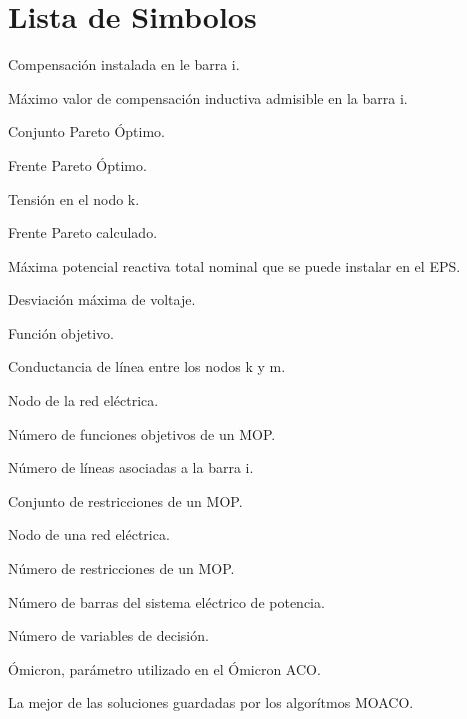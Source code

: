 \newpage

\chapter*{Lista de Simbolos}

\begin{Nomencl}[2em]

\item[$B_i$] Compensaci\'on instalada en le barra i.
\item[${b_{iI}}^m        $] M\'aximo valor de compensaci\'on inductiva admisible en la barra i.
\item[$CPtrue        $] Conjunto Pareto Óptimo.
\item[$Ptrue        $] Frente Pareto Óptimo.
\item[$E_k        $] Tensi\'on en el nodo k.
\item[$FP        $] Frente Pareto calculado.
\item[${f_1}^m        $] M\'axima potencial reactiva total nominal que se puede instalar en el EPS.
\item[$f_3        $] Desviaci\'on m\'axima de voltaje.
\item[$f:\mathbb{R}^n \rightarrow \mathbb{R}        $] Funci\'on objetivo.
\item[$G_{km}        $] Conductancia de l\'inea entre los nodos k y m.
\item[$k        $] Nodo de la red el\'ectrica.
\item[$\textbf{k}        $] N\'umero de funciones objetivos de un MOP.
\item[$l_i        $] N\'umero de l\'ineas asociadas a la barra i.
\item[$e(x)        $] Conjunto de restricciones de un MOP.
\item[$m        $] Nodo de una red el\'ectrica.
\item[$\textbf{m}        $] N\'umero de restricciones de un MOP.
\item[$n        $] N\'umero de barras del sistema el\'ectrico de potencia.
\item[$\textbf{n}        $] N\'umero de variables de decisi\'on.
\item[$O        $] Ómicron, par\'ametro utilizado en el Ómicron ACO.
\item[$P^*        $] La mejor de las soluciones guardadas por los algor\'itmos MOACO.

\end{Nomencl}
